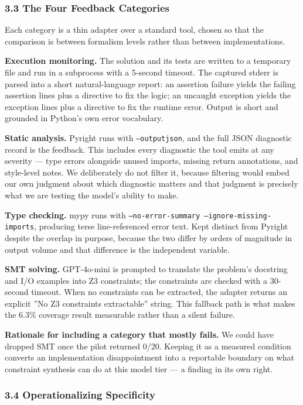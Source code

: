 \subsubsection{3.3 The Four Feedback Categories}

Each category is a thin adapter over a standard tool, chosen so that the comparison is between formalism levels rather than between implementations.

\textbf{Execution monitoring.} The solution and its tests are written to a temporary file and run in a subprocess with a 5-second timeout. The captured stderr is parsed into a short natural-language report: an assertion failure yields the failing assertion lines plus a directive to fix the logic; an uncaught exception yields the exception lines plus a directive to fix the runtime error. Output is short and grounded in Python's own error vocabulary.

\textbf{Static analysis.} Pyright runs with \texttt{--outputjson}, and the full JSON diagnostic record is the feedback. This includes every diagnostic the tool emits at any severity --- type errors alongside unused imports, missing return annotations, and style-level notes. We deliberately do not filter it, because filtering would embed our own judgment about which diagnostic matters and that judgment is precisely what we are testing the model's ability to make.

\textbf{Type checking.} mypy runs with \texttt{--no-error-summary --ignore-missing-imports}, producing terse line-referenced error text. Kept distinct from Pyright despite the overlap in purpose, because the two differ by orders of magnitude in output volume and that difference is the independent variable.

\textbf{SMT solving.} GPT-4o-mini is prompted to translate the problem's docstring and I/O examples into Z3 constraints; the constraints are checked with a 30-second timeout. When no constraints can be extracted, the adapter returns an explicit ''No Z3 constraints extractable'' string. This fallback path is what makes the 6.3\% coverage result measurable rather than a silent failure.

\textbf{Rationale for including a category that mostly fails.} We could have dropped SMT once the pilot returned 0/20. Keeping it as a measured condition converts an implementation disappointment into a reportable boundary on what constraint synthesis can do at this model tier --- a finding in its own right.

\subsubsection{3.4 Operationalizing Specificity}

